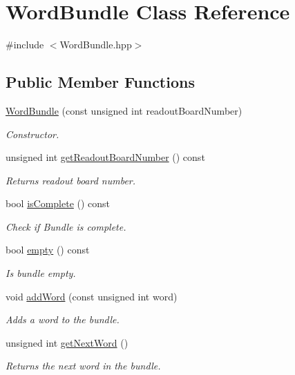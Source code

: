 \hypertarget{class_word_bundle}{}\section{Word\+Bundle Class Reference}
\label{class_word_bundle}


{\ttfamily \#include $<$Word\+Bundle.\+hpp$>$}

\subsection*{Public Member Functions}
\begin{DoxyCompactItemize}
\item 
\hyperlink{class_word_bundle_aef51ca0125b0b39fff34bfa47ddc4334}{Word\+Bundle} (const unsigned int readout\+Board\+Number)
\begin{DoxyCompactList}\small\item\em Constructor. \end{DoxyCompactList}\item 
unsigned int \hyperlink{class_word_bundle_a6d781e8e2bf5b1c0b67346bd6fd44ff9}{get\+Readout\+Board\+Number} () const
\begin{DoxyCompactList}\small\item\em Returns readout board number. \end{DoxyCompactList}\item 
bool \hyperlink{class_word_bundle_a0a817b8d4266b5c2418743bf46ef5dee}{is\+Complete} () const
\begin{DoxyCompactList}\small\item\em Check if Bundle is complete. \end{DoxyCompactList}\item 
bool \hyperlink{class_word_bundle_a18bcb8912a877fa9e60cd8ec707e75a3}{empty} () const
\begin{DoxyCompactList}\small\item\em Is bundle empty. \end{DoxyCompactList}\item 
void \hyperlink{class_word_bundle_a167d2b6b4f504e4347191a8e5bb47e5e}{add\+Word} (const unsigned int word)
\begin{DoxyCompactList}\small\item\em Adds a word to the bundle. \end{DoxyCompactList}\item 
unsigned int \hyperlink{class_word_bundle_a950e328fdf8b00e59b2d68da5182763f}{get\+Next\+Word} ()
\begin{DoxyCompactList}\small\item\em Returns the next word in the bundle. \end{DoxyCompactList}\item 

\end{DoxyCompactItemize}

